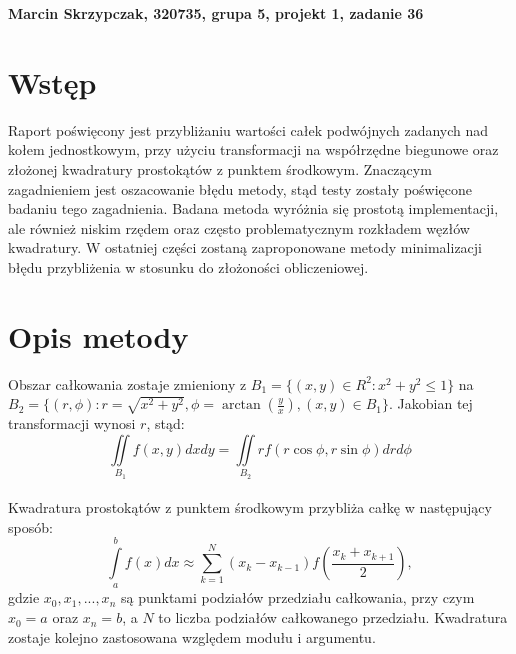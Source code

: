 \documentclass[a4paper,12pt]{article}
\begin{document}
\def\tablename{Tabela} %


\noindent
\textbf{Marcin Skrzypczak, 320735, grupa 5, projekt 1, zadanie 36}

\section*{Wstęp}
    Raport poświęcony jest przybliżaniu wartości całek podwójnych zadanych nad kołem jednostkowym, przy użyciu transformacji na współrzędne biegunowe oraz złożonej kwadratury prostokątów z punktem środkowym. Znaczącym zagadnieniem jest oszacowanie błędu metody, stąd testy zostały poświęcone badaniu tego zagadnienia. Badana metoda wyróżnia się prostotą implementacji, ale również niskim rzędem oraz często problematycznym rozkładem węzłów kwadratury. W ostatniej części zostaną zaproponowane metody minimalizacji błędu przybliżenia w stosunku do złożoności obliczeniowej.

\section*{Opis metody}
    Obszar całkowania zostaje zmieniony z $B_1=\{(x, y)\in R^2: x^2+y^2\leq 1 \}$ na $B_2 = \{(r, \phi): r=\sqrt{x^2+y^2}, \phi=\arctan(\frac{y}{x}), (x,y)\in B_1 \}$. Jakobian tej transformacji wynosi $r$, stąd:
    \[ \iint \limits_{B_1}f(x,y)dxdy = \iint \limits_{B_2}r f(r\cos{\phi},r\sin{\phi})drd\phi \]
    \\
    Kwadratura prostokątów z punktem środkowym przybliża całkę w następujący sposób:
    \[\int\limits_a^bf(x)dx\approx\sum\limits^N_{k=1}(x_k-x_{k-1})f\left(\frac{x_k+x_{k+1}}{2}\right),\]
    gdzie $x_0, x_1, ..., x_n$ są punktami podziałów przedziału całkowania, przy czym $x_0=a$ oraz $x_n=b$, a $N$ to liczba podziałów całkowanego przedziału.
    Kwadratura zostaje kolejno zastosowana względem modułu i argumentu.
    
\end{document}
